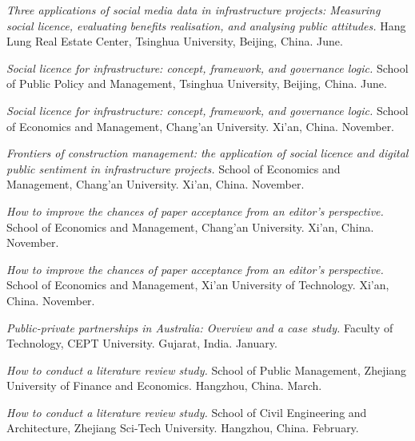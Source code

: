 \documentclass[11pt,a4paper]{report} %
\begin{document}
    \begin{tablist}

        \item[2026] \tab{}\textit{Three applications of social media data in infrastructure projects: Measuring social licence, evaluating benefits realisation, and analysing public attitudes.} Hang Lung Real Estate Center, Tsinghua University, Beijing, China. June.

        \item[2026] \tab{}\textit{Social licence for infrastructure: concept, framework, and governance logic.} School of Public Policy and Management, Tsinghua University, Beijing, China. June.

        \item[2025] \tab{}\textit{Social licence for infrastructure: concept, framework, and governance logic.} School of Economics and Management, Chang'an University. Xi'an, China. November.

        \item[2025] \tab{}\textit{Frontiers of construction management: the application of social licence and digital public sentiment in infrastructure projects.} School of Economics and Management, Chang'an University. Xi'an, China. November.

        \item[2025] \tab{}\textit{How to improve the chances of paper acceptance from an editor's perspective.} School of Economics and Management, Chang'an University. Xi'an, China. November.

        \item[2025] \tab{}\textit{How to improve the chances of paper acceptance from an editor's perspective.} School of Economics and Management, Xi'an University of Technology. Xi'an, China. November.
        
        \item[2025] \tab{}\textit{Public-private partnerships in Australia: Overview and a case study.} Faculty of Technology, CEPT University. Gujarat, India. January.
        
        \item[2024] \tab{}\textit{How to conduct a literature review study.} School of Public Management, Zhejiang University of Finance and Economics. Hangzhou, China. March.
        
        \item[2024] \tab{}\textit{How to conduct a literature review study.} School of Civil Engineering and Architecture, Zhejiang Sci-Tech University. Hangzhou, China. February.
        

\end{tablist}
\end{document}
